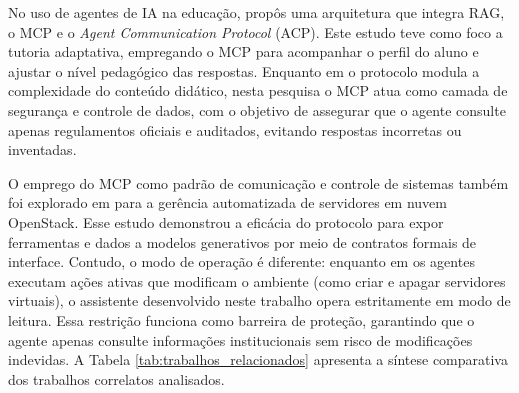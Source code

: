 \documentclass[12pt]{article}
\begin{document}
No uso de agentes de IA na educação, \cite{modran2025leveraging} propôs uma arquitetura que integra RAG, o MCP e o \textit{Agent Communication Protocol} (ACP). Este estudo teve como foco a tutoria adaptativa, empregando o MCP para acompanhar o perfil do aluno e ajustar o nível pedagógico das respostas. Enquanto em \cite{modran2025leveraging} o protocolo modula a complexidade do conteúdo didático, nesta pesquisa o MCP atua como camada de segurança e controle de dados, com o objetivo de assegurar que o agente consulte apenas regulamentos oficiais e auditados, evitando respostas incorretas ou inventadas.

O emprego do MCP como padrão de comunicação e controle de sistemas também foi explorado em \cite{oliveira2025arquitetura} para a gerência automatizada de servidores em nuvem OpenStack. Esse estudo demonstrou a eficácia do protocolo para expor ferramentas e dados a modelos generativos por meio de contratos formais de interface. Contudo, o modo de operação é diferente: enquanto em \cite{oliveira2025arquitetura} os agentes executam ações ativas que modificam o ambiente (como criar e apagar servidores virtuais), o assistente desenvolvido neste trabalho opera estritamente em modo de leitura. Essa restrição funciona como barreira de proteção, garantindo que o agente apenas consulte informações institucionais sem risco de modificações indevidas. A Tabela \ref{tab:trabalhos_relacionados} apresenta a síntese comparativa dos trabalhos correlatos analisados.
\end{document}
